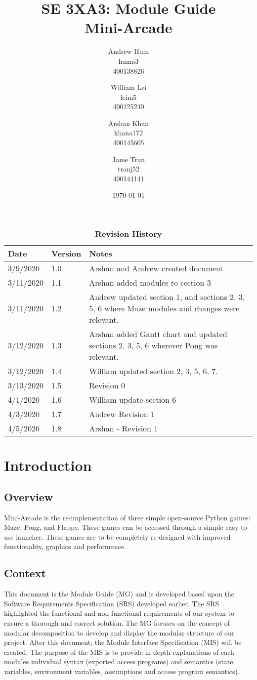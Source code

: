 \documentclass[12pt, titlepage]{article}
\title{SE 3XA3: Module Guide\\Mini-Arcade}
\author{Andrew Hum \\ huma3 \\ 400138826 \and
		William Lei \\ leim5 \\ 400125240 \and
		Arshan Khan \\ khana172 \\ 400145605 \and
		Jame Tran \\ tranj52 \\ 400144141
}
\date{\today}
\begin{document}
\maketitle

\tableofcontents
\newpage
\listoftables
\listoffigures

\begin{table}[bp]
\caption{\bf Revision History}
\begin{tabularx}{\textwidth}{p{3cm}p{2cm}X}
\toprule {\bf Date} & {\bf Version} & {\bf Notes}\\
\midrule
3/9/2020 & 1.0 & Arshan and Andrew created document\\
3/11/2020 & 1.1 & Arshan added modules to section 3\\
3/11/2020 & 1.2 & Andrew updated section 1, and sections 2, 3, 5, 6 where Maze modules and changes were relevant.\\
3/12/2020 & 1.3 & Arshan added Gantt chart and updated sections 2, 3, 5, 6 wherever Pong was relevant.\\
3/12/2020 & 1.4 & William updated section 2, 3, 5, 6, 7.\\
3/13/2020 & 1.5 & Revision 0\\
4/1/2020 & 1.6 & William update section 6 \\
4/3/2020 & 1.7 & Andrew Revision 1 \\
4/5/2020 & 1.8 & Arshan - Revision 1\\
\bottomrule
\end{tabularx}
\end{table}

\newpage


\section{Introduction}
\subsection{Overview}
Mini-Arcade is the re-implementation of three simple open-source Python games: Maze, Pong, and Flappy. These games can be accessed through a simple easy-to-use launcher. These games are to be completely re-designed with improved functionality, graphics and performance.
\subsection{Context}
This document is the Module Guide (MG) and is developed based upon the Software Requirements Specification (SRS) developed earlier. The SRS highlighted the functional and non-functional requirements of our system to ensure a thorough and correct solution. The MG focuses on the concept of modular decomposition to develop and display the modular structure of our project. After this document, the Module Interface Specification (MIS) will be created. The purpose of the MIS is to provide in-depth explanations of each modules individual syntax (exported access programs) and semantics (state variables, environment variables, assumptions and access program semantics).
\end{document}
